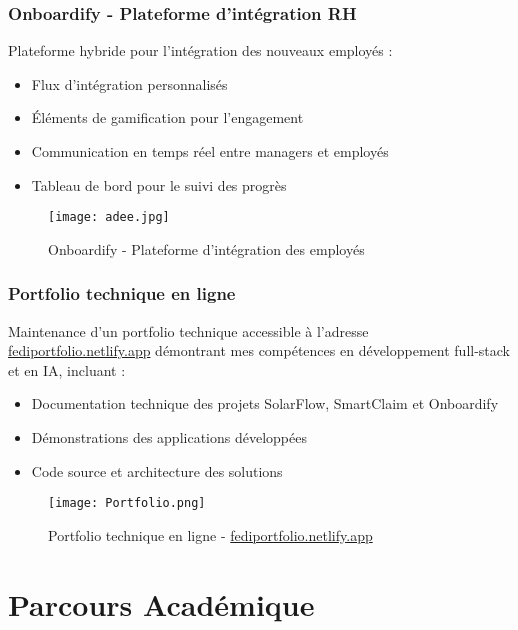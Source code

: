 \documentclass[12pt,a4paper]{report}
\begin{document}
\subsection{Onboardify - Plateforme d'intégration RH}
Plateforme hybride pour l'intégration des nouveaux employés :
\begin{itemize}
    \item Flux d'intégration personnalisés
    \item Éléments de gamification pour l'engagement
    \item Communication en temps réel entre managers et employés
    \item Tableau de bord pour le suivi des progrès
\end{itemize}

\begin{figure}[H]
    \centering
    \texttt{[image: adee.jpg]}
    \caption{Onboardify - Plateforme d'intégration des employés}
    \label{fig:onboardify_app}
\end{figure}

\subsection{Portfolio technique en ligne}
Maintenance d'un portfolio technique accessible à l'adresse \href{https://fediportfolio.netlify.app/}{fediportfolio.netlify.app} démontrant mes compétences en développement full-stack et en IA, incluant :
\begin{itemize}
    \item Documentation technique des projets SolarFlow, SmartClaim et Onboardify
    \item Démonstrations des applications développées
    \item Code source et architecture des solutions
\end{itemize}

\begin{figure}[H]
    \centering
    \texttt{[image: Portfolio.png]}
    \caption{Portfolio technique en ligne - \href{https://fediportfolio.netlify.app/}{fediportfolio.netlify.app}}
    \label{fig:portfolio_online}
\end{figure}

\chapter{Parcours Académique}
\end{document}
